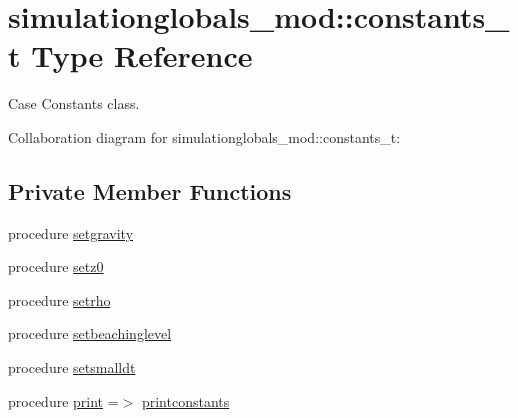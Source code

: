 \hypertarget{structsimulationglobals__mod_1_1constants__t}{}\section{simulationglobals\+\_\+mod\+:\+:constants\+\_\+t Type Reference}
\label{structsimulationglobals__mod_1_1constants__t}


Case Constants class.  




Collaboration diagram for simulationglobals\+\_\+mod\+:\+:constants\+\_\+t\+:
\subsection*{Private Member Functions}
\begin{DoxyCompactItemize}
\item 
procedure \mbox{\hyperlink{structsimulationglobals__mod_1_1constants__t_aac39b1720d2d3f9a7497c69f83694c9a}{setgravity}}
\item 
procedure \mbox{\hyperlink{structsimulationglobals__mod_1_1constants__t_a6517422a0987640f0574bcce3c6566f1}{setz0}}
\item 
procedure \mbox{\hyperlink{structsimulationglobals__mod_1_1constants__t_a8c3a9d4776bce5b6e7ae475bd7711f0b}{setrho}}
\item 
procedure \mbox{\hyperlink{structsimulationglobals__mod_1_1constants__t_a29fa4fda8d4382821d48942ea8232c15}{setbeachinglevel}}
\item 
procedure \mbox{\hyperlink{structsimulationglobals__mod_1_1constants__t_abae3cbfbc8ed893c747a8088da5372e6}{setsmalldt}}
\item 
procedure \mbox{\hyperlink{structsimulationglobals__mod_1_1constants__t_a287a252cb5c736b4da24d79cf9c59897}{print}} =$>$ \mbox{\hyperlink{namespacesimulationglobals__mod_a139cb36f8366e6aec875c7977235fd68}{printconstants}}
\end{DoxyCompactItemize}
